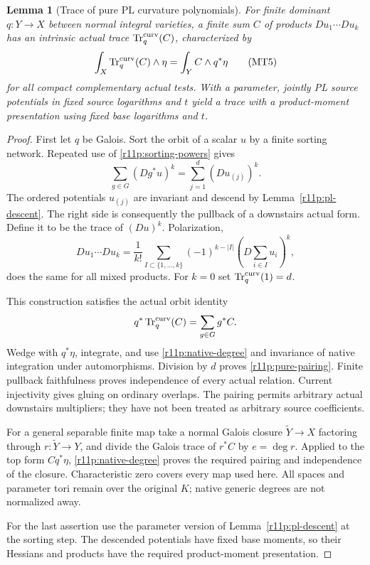 \documentclass[11pt]{article}
\newtheorem{lemma}[theorem]{Lemma}
\theoremstyle{definition}
\theoremstyle{remark}
\numberwithin{equation}{section}
\begin{document}
\begin{lemma}[Trace of pure PL curvature polynomials]
\label{r11p:pure-trace}
For finite dominant $q:Y\to X$ between normal integral varieties, a
finite sum $C$ of products $Du_1\cdots Du_k$ has an intrinsic actual
trace $\operatorname{Tr}^{\rm curv}_q(C)$, characterized by
\[
 \int_X\operatorname{Tr}^{\rm curv}_q(C)\wedge\eta
                         =\int_YC\wedge q^*\eta
\tag{MT5}\label{r11p:pure-pairing}
\]
for all compact complementary actual tests.  With a parameter, jointly
PL source potentials in fixed source logarithms and $t$ yield a trace
with a product-moment presentation using fixed base logarithms and $t$.
\end{lemma}

\begin{proof}
First let $q$ be Galois.  Sort the orbit of a scalar $u$ by a finite
sorting network.  Repeated use of \eqref{r11p:sorting-powers} gives
\[
                     \sum_{g\in G}(Dg^*u)^k
                            =\sum_{j=1}^d(Du_{(j)})^k.
\]
The ordered potentials $u_{(j)}$ are invariant and descend by
Lemma~\ref{r11p:pl-descent}.  The right side is consequently the
pullback of a downstairs actual form.  Define it to be the trace of
$(Du)^k$.  Polarization,
\[
 Du_1\cdots Du_k
   =\frac1{k!}\sum_{I\subset\{1,\ldots,k\}}
           (-1)^{k-|I|}\left(D\sum_{i\in I}u_i\right)^k,
\]
does the same for all mixed products.  For $k=0$ set
$\operatorname{Tr}^{\rm curv}_q(1)=d$.

This construction satisfies the actual orbit identity
\[
                 q^*\operatorname{Tr}^{\rm curv}_q(C)
                                      =\sum_{g\in G}g^*C.
\]
Wedge with $q^*\eta$, integrate, and use
\eqref{r11p:native-degree} and invariance of native integration under
automorphisms.  Division by $d$ proves \eqref{r11p:pure-pairing}.
Finite pullback faithfulness proves independence of every actual
relation.  Current injectivity gives gluing on ordinary overlaps.
The pairing permits arbitrary actual downstairs multipliers; they
have not been treated as arbitrary source coefficients.

For a general separable finite map take a normal Galois closure
$\widetilde Y\to X$ factoring through $r:\widetilde Y\to Y$, and divide
the Galois trace of $r^*C$ by $e=\deg r$.  Applied to the top form
$Cq^*\eta$, \eqref{r11p:native-degree} proves the required pairing and
independence of the closure.  Characteristic zero covers every map
used here.  All spaces and parameter tori remain over the original
$K$; native generic degrees are not normalized away.

For the last assertion use the parameter version of
Lemma~\ref{r11p:pl-descent} at the sorting step.  The descended
potentials have fixed base moments, so their Hessians and products
have the required product-moment presentation.
\end{proof}
\end{document}
